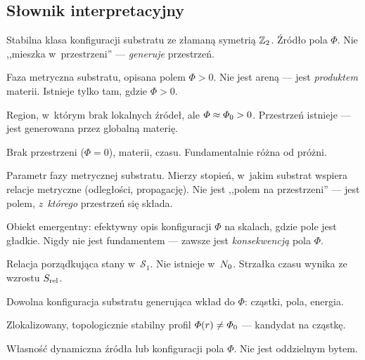 \subsection{S\l{}ownik interpretacyjny}\label{ssec:slownik-interp}

\begin{remark}\label{rem:interpretacja}
\begin{description}[style=nextline, nosep]
  \item[\textbf{Materia}] Stabilna klasa konfiguracji substratu
    ze z\l{}aman\k{a} symetri\k{a} $\mathbb{Z}_2$. \'Zr\'od\l{}o pola $\Phi$.
    Nie ,,mieszka w~przestrzeni'' --- \emph{generuje} przestrze\'n.
  \item[\textbf{Przestrze\'n}] Faza metryczna substratu, opisana
    polem $\Phi > 0$. Nie jest aren\k{a} --- jest \emph{produktem}
    materii. Istnieje tylko tam, gdzie $\Phi > 0$.
  \item[\textbf{Pr\'o\.znia (lokalna)}] Region, w~kt\'orym brak
    lokalnych \'zr\'ode\l{}, ale $\varPhi \approx \varPhi_0 > 0$.
    Przestrze\'n istnieje --- jest generowana przez globaln\k{a}
    materi\k{e}.
  \item[\textbf{Nico\'s\'c ($\Nzero$)}] Brak przestrzeni ($\Phi = 0$),
    materii, czasu. Fundamentalnie r\'o\.zna od pr\'o\.zni.
  \item[\textbf{Pole $\Phi$}] Parametr fazy metrycznej substratu.
    Mierzy stopie\'n, w~jakim substrat wspiera relacje metryczne
    (odleg\l{}o\'sci, propagacj\k{e}). Nie jest ,,polem na
    przestrzeni'' --- jest polem, \emph{z~kt\'orego} przestrze\'n
    si\k{e} sk\l{}ada.
  \item[\textbf{Geometria ($g_{\mu\nu}$)}] Obiekt emergentny:
    efektywny opis konfiguracji $\Phi$ na skalach, gdzie pole
    jest g\l{}adkie. Nigdy nie jest fundamentem --- zawsze jest
    \emph{konsekwencj\k{a}} pola $\Phi$.
  \item[\textbf{Czas}] Relacja porz\k{a}dkuj\k{a}ca stany
    w~$\mathcal{S}_1$. Nie istnieje w~$\Nzero$.
    Strza\l{}ka czasu wynika ze wzrostu $S_{\mathrm{rel}}$.
  \item[\textbf{\'Zr\'od\l{}o}] Dowolna konfiguracja substratu
    generuj\k{a}ca wk\l{}ad do $\Phi$: cz\k{a}stki, pola, energia.
  \item[\textbf{Defekt}] Zlokalizowany, topologicznie stabilny
    profil $\varPhi(r) \neq \varPhi_0$ --- kandydat na cz\k{a}stk\k{e}.
  \item[\textbf{Energia}] W\l{}asno\'s\'c dynamiczna \'zr\'od\l{}a
    lub konfiguracji pola $\Phi$. Nie jest oddzielnym bytem.
\end{description}
\end{remark}

